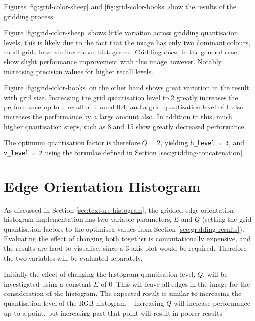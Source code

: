 Figures \ref{fig:grid-color-sheep} and \ref{fig:grid-color-books} show the results of the gridding process.

Figure \ref{fig:grid-color-sheep} shows little variation across gridding quantisation levels, this is likely due to the fact that the image has only two dominant colours, so all grids have similar colour histograms. Gridding does, in the general case, show slight performance improvement with this image however. Notably increasing precision values for higher recall levels.

Figure \ref{fig:grid-color-books} on the other hand shows great variation in the result with grid size. Increasing the grid quantisation level to 2 greatly increases the performance up to a recall of around 0.4, and a grid quantisation level of 1 also increases the performance by a large amount also. In addition to this, much higher quantisation steps, such as 8 and 15 show greatly decreased performance.

The optimum quantisation factor is therefore $Q=2$, yielding \texttt{h\_level = 3}, and \texttt{v\_level = 2} using the formulae defined in Section \ref{sec:gridding-concatenation}.


\FloatBarrier
\section{Edge Orientation Histogram} \label{sec:texture-histogram-results}
As discussed in Section \ref{sec:texture-histogram}, the gridded edge orientation histogram implementation has two variable parameters, $E$ and $Q$ (setting the grid quantisation factors to the optimised values from Section \ref{sec:gridding-results}). Evaluating the effect of changing both together is computationally expensive, and the results are hard to visualise, since a 3-axis plot would be required. Therefore the two variables will be evaluated separately.

Initially the effect of changing the histogram quantisation level, $Q$, will be investigated using a constant $E$ of $0$. This will leave all edges in the image for the consideration of the histogram. The expected result is similar to increasing the quantisation level of the RGB histogram -- increasing $Q$ will increase performance up to a point, but increasing past that point will result in poorer results

